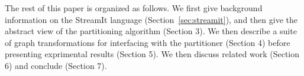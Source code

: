 The rest of this paper is organized as follows.  We first give
background information on the StreamIt language
(Section~\ref{sec:streamit}), and then give the abstract view of the
partitioning algorithm (Section 3).  We then describe a suite of graph
transformations for interfacing with the partitioner (Section 4)
before presenting exprimental results (Section 5).  We then discuss
related work (Section 6) and conclude (Section 7).
